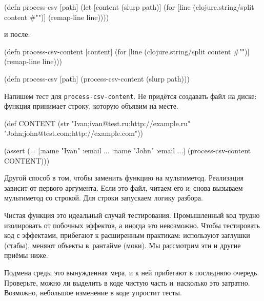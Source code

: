 
\begin{english}
  \begin{clojure}
(defn process-csv [path]
  (let [content (slurp path)]
    (for [line (clojure.string/split content #"\n")]
      (remap-line line))))
  \end{clojure}
\end{english}

\noindent
и после:

\begin{english}
  \begin{clojure}
(defn process-csv-content [content]
  (for [line (clojure.string/split content #"\n")]
    (remap-line line)))

(defn process-csv [path]
  (process-csv-content (slurp path)))
  \end{clojure}
\end{english}

Напишем тест для \verb|process-csv-content|. Не придётся создавать файл на
диске: функция принимает строку, которую объявим на месте.

\begin{english}
  \begin{clojure}
(def CONTENT
  (str "Ivan;ivan@test.ru;http://example.ru"
       \newline
       "John;john@test.com;http://example.com"))

(assert (= [{:name "Ivan" :email ...}
            {:name "John" :email ...}]
           (process-csv-content CONTENT)))
  \end{clojure}
\end{english}

Другой способ в том, чтобы заменить функцию на мультиметод. Реализация зависит
от первого аргумента. Если это файл, читаем его и~снова вызываем мультиметод со
строкой. Для строки запускаем логику разбора.

Чистая функция это идеальный случай тестирования. Промышленный код трудно
изолировать от побочных эффектов, а иногда это невозможно. Чтобы тестировать код
с эффектами, прибегают к расширенным практикам: используют заглушки (стабы),
меняют объекты в~рантайме (моки). Мы рассмотрим эти и другие приёмы ниже.

Подмена среды это вынужденная мера, и к ней прибегают в последнюю
очередь. Проверьте, можно ли выделить в коде чистую часть и~насколько это
затратно. Возможно, небольшое изменение в коде упростит тесты.

